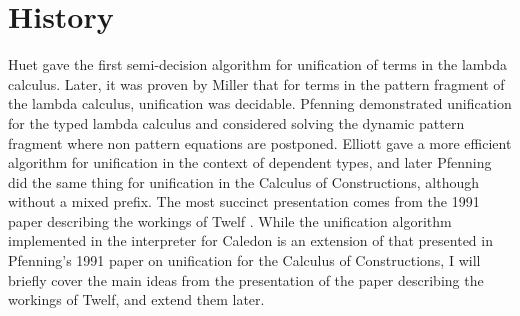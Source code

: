 \section{History}

Huet \citep{Huet75} gave the first semi-decision algorithm for unification of 
terms in the lambda calculus.  
Later, it was proven by Miller \citep{miller1986higher} 
that for terms in the pattern fragment of the lambda calculus, unification was decidable.  
Pfenning \citep{pfenning1988partial} \citep{pfenning1988higher} demonstrated unification for the typed lambda calculus and considered solving the dynamic pattern fragment where non pattern equations
are postponed.
Elliott\citep{elliott1989higher} gave a more efficient algorithm for unification in the context 
of dependent types, and later Pfenning \citep{pfenning1991unification}
did the same thing for unification in the Calculus of Constructions, although without a mixed prefix.  
The most succinct presentation comes from the 1991 paper describing the workings of Twelf 
\citep{pfenning1991logic}.  While the unification algorithm implemented in the interpreter for Caledon is 
an extension of that presented in Pfenning's 1991 paper on unification for 
the Calculus of Constructions\citep{pfenning1991unification}, 
I will briefly cover the main ideas from the presentation of the paper describing the workings of Twelf, 
and extend them later.


